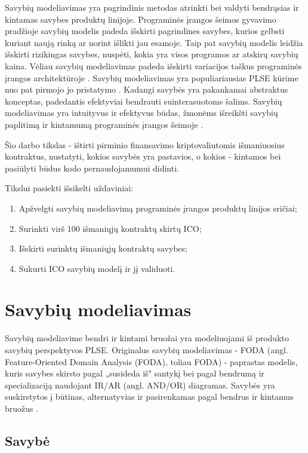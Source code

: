 \documentclass{VUMIFPSkursinis}
\begin{document}
Savybių modeliavimas yra pagrindinis metodas atrinkti bei valdyti bendrąsias ir kintamas savybes produktų linijoje. Programinės įrangos šeimos gyvavimo pradžioje savybių modelis padeda išskirti pagrindines savybes, kurios gelbsti kuriant naują rinką ar  norint išlikti jau esamoje. Taip pat savybių modelis leidžia išskirti rizikingas savybes, nuspėti, kokia yra visos programos ar atskirų savybių kaina. Vėliau savybių modeliavimas padeda išskirti variacijos taškus programinės įrangos architektūroje \cite{Czarnecki2004}. Savybių modeliavimas yra populiariausias PLSE kūrime nuo pat pirmojo jo pristatymo \cite{Kang1990}. Kadangi savybės yra pakankamai abstraktus konceptas, padedantis efektyviai bendrauti suinterasuotoms šalims. Savybių modeliavimas yra intuityvus ir efektyvus būdas, žmonėms išreikšti savybių paplitimą ir kintamumą programinės įrangos šeimoje \cite{Kang2013}. 

Šio darbo tikslas - ištirti pirminio finansavimo kriptovaliutomis išmaniuosius kontraktus, nustatyti, kokios savybės yra pastavios, o kokios - kintamos bei pasiūlyti būdus kodo pernaudojamumui didinti. 

Tikslui pasiekti išsikelti uždaviniai:
\begin{enumerate}[topsep=0pt,itemsep=-1ex,partopsep=1ex,parsep=1ex]
\item Apžvelgti savybių modeliavimą programinės įrangos produktų linijos sričiai;
\item Surinkti virš 100 išmaniųjų kontraktų skirtų ICO;
\item Išskirti surinktų išmaniųjų kontraktų savybes;
\item Sukurti ICO savybių modelį ir jį validuoti.
\end{enumerate}

\section{Savybių modeliavimas}

Savybių modeliavime bendri ir kintami bruožai yra modeliuojami iš produkto savybių perspektyvos PLSE. Originalus savybių modeliavimas - FODA (angl. Feature-Oriented Domain Analysis (FODA), toliau FODA) \cite{Kang1990} - paprastas modelis, kuris savybes skirsto pagal „susideda iš" santykį bei pagal bendrumą ir specializaciją naudojant IR/AR (angl. AND/OR)  diagramas. Savybės yra suskirstytos į būtinas, alternatyvias ir pasirenkamas pagal bendrus ir kintamus bruožus \cite{Kang2013}.

\subsection{Savybė} \label{savybe}
\end{document}
